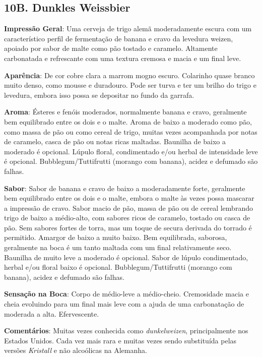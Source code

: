 \subsection*{10B. Dunkles Weissbier}
\textbf{Impressão Geral}: Uma cerveja de trigo alemã moderadamente escura com um característico perfil de fermentação de banana e cravo da levedura weizen, apoiado por sabor de malte como pão tostado e caramelo. Altamente carbonatada e refrescante com uma textura cremosa e macia e um final leve.

\textbf{Aparência}: De cor cobre clara a marrom mogno escuro. Colarinho quase branco muito denso, como mousse e duradouro. Pode ser turva e ter um brilho do trigo e levedura, embora isso possa se depositar no fundo da garrafa.

\textbf{Aroma}: Ésteres e fenóis moderados, normalmente banana e cravo, geralmente bem equilibrado entre os dois e o malte. Aroma de baixo a moderado como pão, como massa de pão ou como cereal de trigo, muitas vezes acompanhada por notas de caramelo, casca de pão ou notas ricas maltadas. Baunilha de baixo a moderado é opcional. Lúpulo floral, condimentado e/ou herbal de intensidade leve é opcional. Bubblegum/Tuttifrutti (morango com banana), acidez e defumado são falhas.

\textbf{Sabor}: Sabor de banana e cravo de baixo a moderadamente forte, geralmente bem equilibrado entre os dois e o malte, embora o malte às vezes possa mascarar a impressão de cravo. Sabor macio de pão, massa de pão ou de cereal lembrando trigo de baixo a médio-alto, com sabores ricos de caramelo, tostado ou casca de pão. Sem sabores fortes de torra, mas um toque de secura derivada do torrado é permitido. Amargor de baixo a muito baixo. Bem equilibrada, saborosa, geralmente na boca é um tanto maltada com um final relativamente seco. Baunilha de muito leve a moderado é opcional. Sabor de lúpulo condimentado, herbal e/ou floral baixo é opcional. Bubblegum/Tuttifrutti (morango com banana), acidez e defumado são falhas.

\textbf{Sensação na Boca}: Corpo de médio-leve a médio-cheio. Cremosidade macia e cheia evoluindo para um final mais leve com a ajuda de uma carbonatação de moderada a alta. Efervescente.

\textbf{Comentários}: Muitas vezes conhecida como \textit{dunkelweizen}, principalmente nos Estados Unidos. Cada vez mais rara e muitas vezes sendo substituída pelas versões \textit{Kristall} e não alcoólicas na Alemanha.

